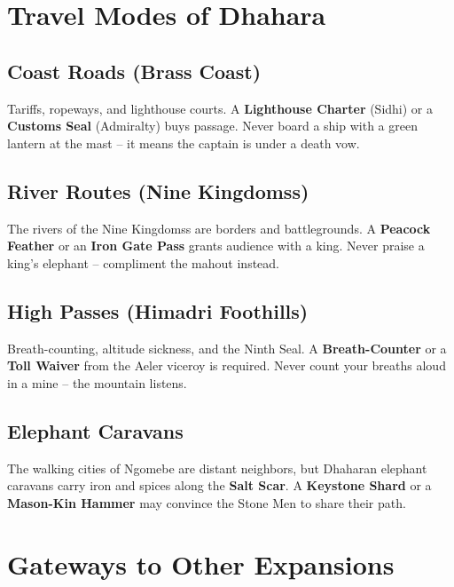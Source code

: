 \documentclass[12pt,oneside]{book}
\begin{document}
\section*{Travel Modes of Dhahara}

\subsection*{Coast Roads (Brass Coast)}
Tariffs, ropeways, and lighthouse courts. A \textbf{Lighthouse Charter} (Sidhi) or a \textbf{Customs Seal} (Admiralty) buys passage. Never board a ship with a green lantern at the mast -- it means the captain is under a death vow.

\subsection*{River Routes (Nine Kingdomss)}
The rivers of the Nine Kingdomss are borders and battlegrounds. A \textbf{Peacock Feather} or an \textbf{Iron Gate Pass} grants audience with a king. Never praise a king's elephant -- compliment the mahout instead.

\subsection*{High Passes (Himadri Foothills)}
Breath-counting, altitude sickness, and the Ninth Seal. A \textbf{Breath-Counter} or a \textbf{Toll Waiver} from the Aeler viceroy is required. Never count your breaths aloud in a mine -- the mountain listens.

\subsection*{Elephant Caravans}
The walking cities of Ngomebe are distant neighbors, but Dhaharan elephant caravans carry iron and spices along the \textbf{Salt Scar}. A \textbf{Keystone Shard} or a \textbf{Mason-Kin Hammer} may convince the Stone Men to share their path.

\section*{Gateways to Other Expansions}
\end{document}
